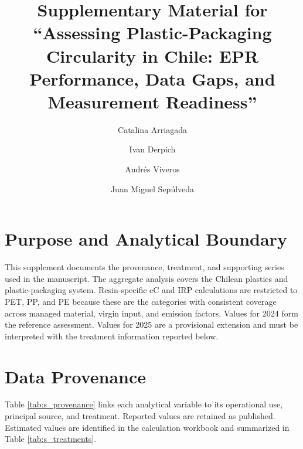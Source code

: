 \documentclass[review,10pt]{elsarticle}
\begin{document}
\begin{frontmatter}

\title{Supplementary Material for ``Assessing Plastic-Packaging Circularity in Chile: EPR Performance, Data Gaps, and Measurement Readiness''}

\author[1]{Catalina Arriagada}
\author[1]{Ivan Derpich}
\author[1]{Andrés Viveros}
\author[1]{Juan Miguel Sepúlveda}
\address[1]{Departamento de Ingeniería Industrial, Universidad de Santiago de Chile, Santiago, Chile}

\end{frontmatter}

\section{Purpose and Analytical Boundary}

This supplement documents the provenance, treatment, and supporting series used in the manuscript. The aggregate analysis covers the Chilean plastics and plastic-packaging system. Resin-specific eC and IRP calculations are restricted to PET, PP, and PE because these are the categories with consistent coverage across managed material, virgin input, and emission factors. Values for 2024 form the reference assessment. Values for 2025 are a provisional extension and must be interpreted with the treatment information reported below.

\section{Data Provenance}

Table \ref{tab:s_provenance} links each analytical variable to its operational use, principal source, and treatment. Reported values are retained as published. Estimated values are identified in the calculation workbook and summarized in Table \ref{tab:s_treatments}.
\end{document}
